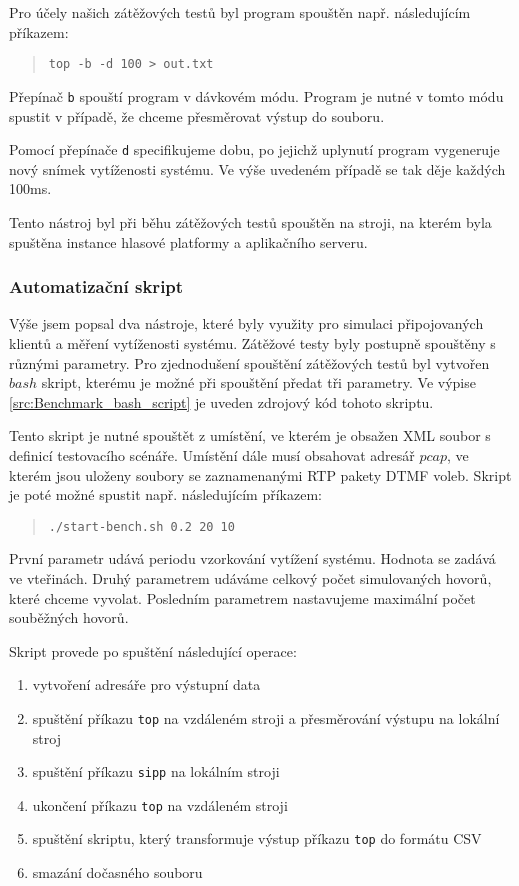 \documentclass[ing,male,java,dept460]{diploma}						%
\begin{document}
Pro účely našich zátěžových testů byl program spouštěn např. následujícím příkazem:

\begin{quote}
	\texttt{top -b -d 100 > out.txt}
\end{quote}

Přepínač \texttt{b} spouští program v dávkovém módu. Program je nutné v tomto módu spustit v případě, že chceme přesměrovat výstup do souboru.

Pomocí přepínače \texttt{d} specifikujeme dobu, po jejichž uplynutí program vygeneruje nový snímek vytíženosti systému. Ve výše uvedeném případě se tak děje každých 100ms.

Tento nástroj byl při běhu zátěžových testů spouštěn na stroji, na kterém byla spuštěna instance hlasové platformy a aplikačního serveru.

\subsubsection{Automatizační skript}
Výše jsem popsal dva nástroje, které byly využity pro simulaci připojovaných klientů a měření vytíženosti systému. Zátěžové testy byly postupně spouštěny s různými parametry. Pro zjednodušení spouštění zátěžových testů byl vytvořen $bash$ skript, kterému je možné při spouštění předat tři parametry. Ve výpise \ref{src:Benchmark_bash_script} je uveden zdrojový kód tohoto skriptu.



Tento skript je nutné spouštět z umístění, ve kterém je obsažen XML soubor s definicí testovacího scénáře. Umístění dále musí obsahovat adresář $pcap$, ve kterém jsou uloženy soubory se zaznamenanými RTP pakety DTMF voleb. Skript je poté možné spustit např. následujícím příkazem:

\begin{quote}
	\texttt{./start-bench.sh 0.2 20 10}
\end{quote}

První parametr udává periodu vzorkování vytížení systému. Hodnota se zadává ve vteřinách. Druhý parametrem udáváme celkový počet simulovaných hovorů, které chceme vyvolat. Posledním parametrem nastavujeme maximální počet souběžných hovorů.

Skript provede po spuštění následující operace:

\begin{enumerate}
\item vytvoření adresáře pro výstupní data
\item spuštění příkazu \texttt{top} na vzdáleném stroji a přesměrování výstupu na lokální stroj
\item spuštění příkazu \texttt{sipp} na lokálním stroji
\item ukončení příkazu \texttt{top} na vzdáleném stroji
\item spuštění skriptu, který transformuje výstup příkazu \texttt{top} do formátu CSV
\item smazání dočasného souboru
\end{enumerate}
\end{document}

